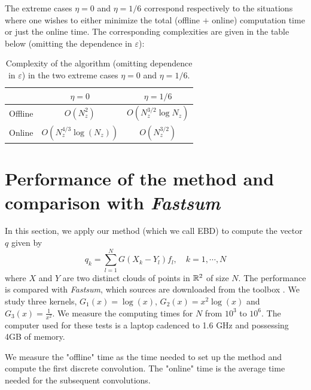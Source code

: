 \documentclass[main]{subfiles}
\begin{document}
\begin{remark}
	The extreme cases $\eta= 0$ and $\eta = 1/6$ correspond respectively to the situations where one wishes to either minimize the total (offline $+$ online) computation time or just the online time. The corresponding complexities are given in the table below (omitting the dependence in $\varepsilon$):	
	\begin{table}[H]
		\centering
		\begin{tabular}{ |c|c|c| } 
			\hline
			& $\eta = 0 $    & $\eta = 1/6$       \\ 
			\hline
			Offline   & $O(N_z^2)$  & $O\left(N_z^{3/2} \log N_z\right)$  \\ 
			Online & $O(N_z^{4/3} \log(N_z))$ & $O(N_z^{3/2})$ \\ 
			\hline
		\end{tabular}
		\caption{Complexity of the algorithm (omitting dependence in $\varepsilon$) in the two extreme cases $\eta=0$ and $\eta = 1/6$.}
	\end{table}									
\end{remark}

\section{Performance of the method and comparison with \textit{Fastsum}}
\label{sec:numericalPerf}
In this section, we apply our method (which we call EBD) to compute the vector $q$ given by 
\[q_k = \sum_{l = 1}^{N} G(X_k - Y_l) f_l, \quad k = 1, \cdots, N\]
where $X$ and $Y$ are two distinct clouds of points in $\mathbb{R}^2$ of size $N$. The performance is compared with \textit{Fastsum}, which sources are downloaded from the toolbox \cite{Fastsum}. We study three kernels, $G_1(x) = \log(x)$, $G_2(x) = x^2 \log(x)$ and $G_3(x) = \frac{1}{x^2}$. We measure the computing times for $N$ from $10^3$ to $10^6$. The computer used for these tests is a laptop cadenced to 1.6 GHz and possessing 4GB of memory.

We measure the "offline" time as the time needed to set up the method and compute the first discrete convolution. The "online" time is the average time needed for the subsequent convolutions. 
\end{document}
